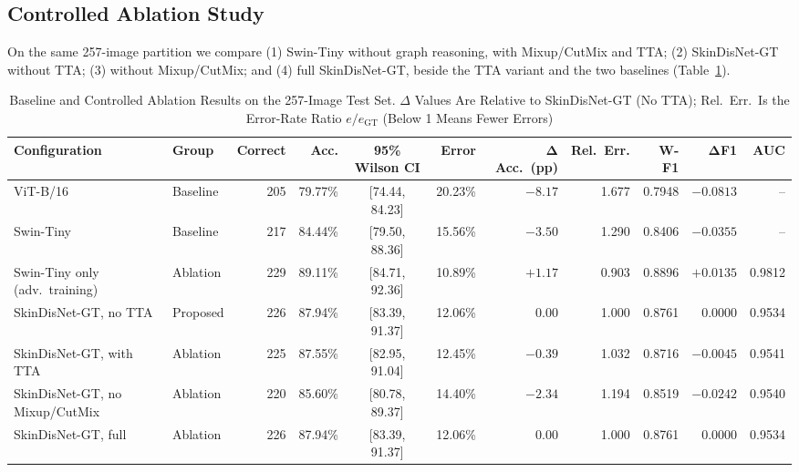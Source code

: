 \documentclass[conference]{IEEEtran}
\begin{document}
\subsection{Controlled Ablation Study}
On the same 257-image partition we compare (1) Swin-Tiny without graph reasoning, with Mixup/CutMix and TTA; (2) SkinDisNet-GT without TTA; (3) without Mixup/CutMix; and (4) full SkinDisNet-GT, beside the TTA variant and the two baselines (Table~\ref{tab:ablation}).

\begin{table}[!t]
\caption{Baseline and Controlled Ablation Results on the 257-Image Test Set. $\Delta$ Values Are Relative to SkinDisNet-GT (No TTA); Rel.\ Err.\ Is the Error-Rate Ratio $e/e_{\text{GT}}$ (Below 1 Means Fewer Errors)}
\label{tab:ablation}
\centering
\scriptsize
\setlength{\tabcolsep}{4pt}
\begin{tabular}{@{}l|l|rrcr|rr|rr|r@{}}
\toprule
\textbf{Configuration} & \textbf{Group} & \textbf{Correct} & \textbf{Acc.} & \textbf{95\% Wilson CI} & \textbf{Error} & $\boldsymbol{\Delta}$\textbf{Acc.\ (pp)} & \textbf{Rel.\ Err.} & \textbf{W-F1} & $\boldsymbol{\Delta}$\textbf{F1} & \textbf{AUC} \\
\midrule
ViT-B/16 & Baseline & 205 & 79.77\% & [74.44, 84.23] & 20.23\% & $-8.17$ & 1.677 & 0.7948 & $-0.0813$ & -- \\
Swin-Tiny & Baseline & 217 & 84.44\% & [79.50, 88.36] & 15.56\% & $-3.50$ & 1.290 & 0.8406 & $-0.0355$ & -- \\
Swin-Tiny only (adv.\ training) & Ablation & 229 & 89.11\% & [84.71, 92.36] & 10.89\% & $+1.17$ & 0.903 & 0.8896 & $+0.0135$ & 0.9812 \\
SkinDisNet-GT, no TTA & Proposed & 226 & 87.94\% & [83.39, 91.37] & 12.06\% & 0.00 & 1.000 & 0.8761 & 0.0000 & 0.9534 \\
SkinDisNet-GT, with TTA & Ablation & 225 & 87.55\% & [82.95, 91.04] & 12.45\% & $-0.39$ & 1.032 & 0.8716 & $-0.0045$ & 0.9541 \\
SkinDisNet-GT, no Mixup/CutMix & Ablation & 220 & 85.60\% & [80.78, 89.37] & 14.40\% & $-2.34$ & 1.194 & 0.8519 & $-0.0242$ & 0.9540 \\
SkinDisNet-GT, full & Ablation & 226 & 87.94\% & [83.39, 91.37] & 12.06\% & 0.00 & 1.000 & 0.8761 & 0.0000 & 0.9534 \\
\bottomrule
\end{tabular}
\end{table}
\end{document}
